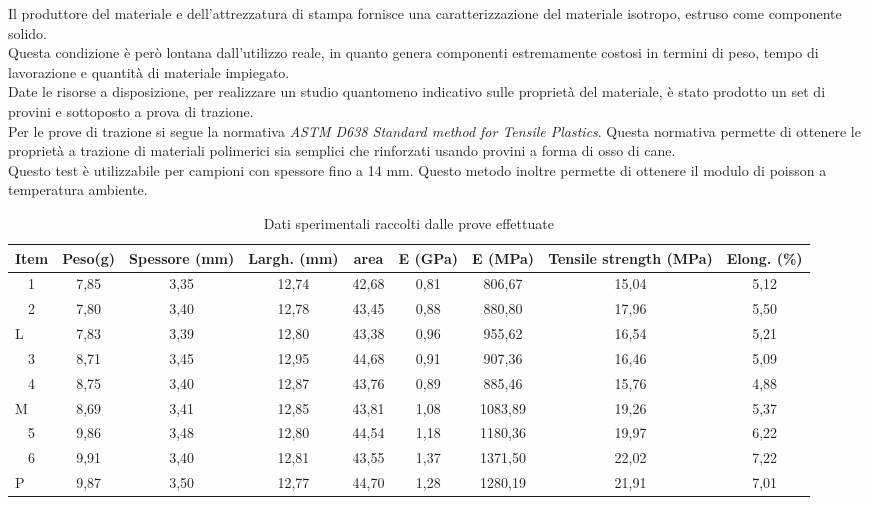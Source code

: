 \documentclass[%
corpo=11pt,
twoside,
 stile=classica,
oldstyle,
greek,%
]{toptesi}
\begin{document}
	
	Il produttore del materiale e dell'attrezzatura di stampa fornisce una caratterizzazione del materiale isotropo, estruso come componente solido.\\
	 Questa condizione è però lontana dall'utilizzo reale, in quanto genera componenti estremamente costosi in termini di peso, tempo di lavorazione e quantità di materiale impiegato. \\
	Date le risorse a disposizione, per realizzare un studio quantomeno indicativo sulle proprietà del materiale, è stato prodotto un set di provini e sottoposto a prova di trazione.\\
	Per le prove di trazione si segue la normativa \textit{ASTM D638 Standard method for Tensile Plastics}. Questa normativa permette di ottenere le proprietà a trazione di materiali polimerici sia semplici che rinforzati usando provini a forma di osso di cane. \\
	Questo test è utilizzabile per campioni con spessore fino a 14 mm. Questo metodo inoltre permette di ottenere il modulo di poisson a temperatura ambiente. 
\begin{table}[htbp]
	\centering
	\caption{Dati sperimentali raccolti dalle prove effettuate}
	\begin{tabular}{|p{3.5em}|c|c|c|c|c|c|c|c|}
		\hline
		Item & \multicolumn{1}{p{3.5em}|}{Peso(g)} & \multicolumn{1}{p{3.5em}|}{Spessore (mm)} & \multicolumn{1}{p{3.5em}|}{Largh. (mm)} & \multicolumn{1}{p{3.5em}|}{area} & \multicolumn{1}{p{3.5em}|}{E (GPa)} & \multicolumn{1}{p{3.5em}|}{E (MPa)} & \multicolumn{1}{p{3.5em}|}{Tensile strength (MPa)} & \multicolumn{1}{p{3.5em}|}{Elong. (\%)} \bigstrut\\
		\hline
		\multicolumn{1}{|c|}{1} & 7,85  & 3,35  & 12,74 & 42,68 & 0,81  & 806,67 & 15,04 & 5,12 \bigstrut\\
		\hline
		\multicolumn{1}{|c|}{2} & 7,80  & 3,40  & 12,78 & 43,45 & 0,88  & 880,80 & 17,96 & 5,50 \bigstrut\\
		\hline
		L     & 7,83  & 3,39  & 12,80 & 43,38 & 0,96  & 955,62 & 16,54 & 5,21 \bigstrut\\
		\hline
		\multicolumn{1}{|c|}{3} & 8,71  & 3,45  & 12,95 & 44,68 & 0,91  & 907,36 & 16,46 & 5,09 \bigstrut\\
		\hline
		\multicolumn{1}{|c|}{4} & 8,75  & 3,40  & 12,87 & 43,76 & 0,89  & 885,46 & 15,76 & 4,88 \bigstrut\\
		\hline
		M     & 8,69  & 3,41  & 12,85 & 43,81 & 1,08  & 1083,89 & 19,26 & 5,37 \bigstrut\\
		\hline
		\multicolumn{1}{|c|}{5} & 9,86  & 3,48  & 12,80 & 44,54 & 1,18  & 1180,36 & 19,97 & 6,22 \bigstrut\\
		\hline
		\multicolumn{1}{|c|}{6} & 9,91  & 3,40  & 12,81 & 43,55 & 1,37  & 1371,50 & 22,02 & 7,22 \bigstrut\\
		\hline
		P     & 9,87  & 3,50  & 12,77 & 44,70 & 1,28  & 1280,19 & 21,91 & 7,01 \bigstrut\\
		\hline
	\end{tabular}%
	\label{tab:testdata}%
\end{table}%
\end{document}
